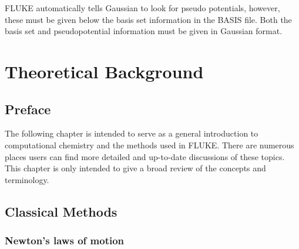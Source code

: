 \documentclass[12pt]{report}
\begin{document}
FLUKE automatically tells Gaussian to look for pseudo potentials, however,
these must be given below the basis set information in the BASIS file. Both
the basis set and pseudopotential information must be given in Gaussian
format.

\chapter{Theoretical Background}
\label{chap:Theory}

\section{Preface}

The following chapter is intended to serve as a general introduction to
computational chemistry and the methods used in FLUKE. There are numerous
places users can find more detailed and up-to-date discussions of these
topics. This chapter is only intended to give a broad review of the concepts
and terminology.

\section{Classical Methods}

\subsection{Newton's laws of motion}
\end{document}
